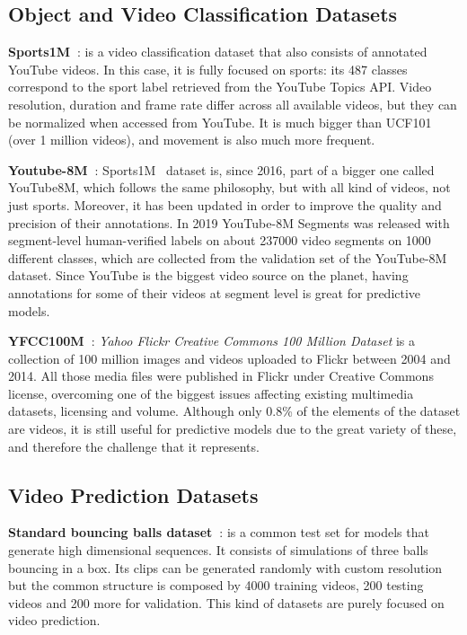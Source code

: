\vspace*{0.1cm}\noindent\subsection{Object and Video Classification Datasets}
\textbf{Sports1M~\cite{Karpathy2014}}: is a video classification dataset that also consists of annotated YouTube videos. In this case, it is fully focused on sports: its \num{487} classes correspond to the sport label retrieved from the YouTube Topics API. Video resolution, duration and frame rate differ across all available videos, but they can be normalized when accessed from YouTube. It is much bigger than UCF101 (over 1 million videos), and movement is also much more frequent.

\vspace*{0.1cm}\noindent\textbf{Youtube-8M~\cite{Abu-El-Haija2016}}: Sports1M~\cite{Karpathy2014} dataset is, since 2016, part of a bigger one called YouTube8M, which follows the same philosophy, but with all kind of videos, not just sports. Moreover, it has been updated in order to improve the quality and precision of their annotations. In 2019 YouTube-8M Segments was released with segment-level human-verified labels on about \num{237000} video segments on \num{1000} different classes, which are collected from the validation set of the YouTube-8M dataset. Since YouTube is the biggest video source on the planet, having annotations for some of their videos at segment level is great for predictive models.

\vspace*{0.1cm}\noindent\textbf{YFCC100M~\cite{Thomee2016}}: \textit{Yahoo Flickr Creative Commons 100 Million Dataset} is a collection of \num{100} million images and videos uploaded to Flickr between 2004 and 2014. All those media files were published in  Flickr under Creative Commons license, overcoming one of the biggest issues affecting existing multimedia datasets, licensing and volume. Although only 0.8\% of the elements of the dataset are videos, it is still useful for predictive models due to the great variety of these, and therefore the challenge that it represents.

\subsection{Video Prediction Datasets}
\textbf{Standard bouncing balls dataset~\cite{Sutskever2008}}: is a common test set for models that generate high dimensional sequences. It consists of simulations of three balls bouncing in a box. Its clips can be generated randomly with custom resolution but the common structure is composed by \num{4000} training videos, \num{200} testing videos and \num{200} more for validation. This kind of datasets are purely focused on video prediction.

